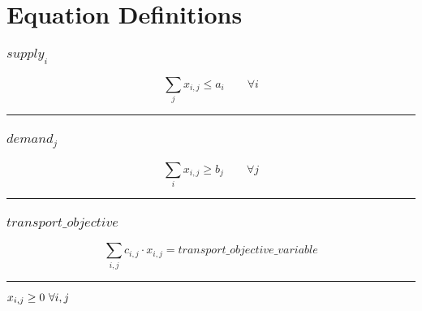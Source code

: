 \documentclass[11pt]{article}
\begin{document}
\section*{Equation Definitions}
\subsubsection*{$supply_{i}$}
\begin{equation*}
\sum_{j} x_{i,j} \leq a_{i}\qquad \forall i
\end{equation*}
\vspace{5pt}
\hrule
\subsubsection*{$demand_{j}$}
\begin{equation*}
\sum_{i} x_{i,j} \geq b_{j}\qquad \forall j
\end{equation*}
\vspace{5pt}
\hrule
\subsubsection*{$transport\_objective$}
\begin{equation*}
\sum_{i,j} c_{i,j} \cdot x_{i,j} = transport\_objective\_variable
\end{equation*}
\vspace{5pt}
\hrule
\bigskip
$x_{i,j}\geq 0 ~ \forall i,j\\$
\end{document}
